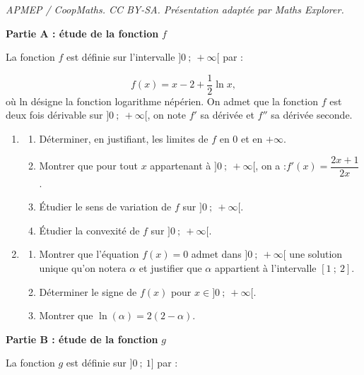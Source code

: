 \documentclass[10pt]{article}
\begin{document}
\noindent\textit{APMEP / CoopMaths. CC BY-SA. Présentation adaptée par Maths Explorer.}\par\medskip
\medskip

\textbf{Partie A : étude de la fonction }\boldmath$f$\unboldmath

\medskip

La fonction $f$ est définie sur l'intervalle $]0 ~;~+\infty[$ par : 

\[f(x)=x-2+\dfrac{1}{2} \ln x,\]
 où ln désigne la fonction logarithme népérien. On admet que la fonction $f$ est deux fois dérivable sur $] 0 ~;~ +\infty[$, on note $f'$ sa dérivée et $f''$ sa dérivée seconde.

\begin{enumerate}
	\item \begin{enumerate}
		\item Déterminer, en justifiant, les limites de $f$ en 0 et en $+\infty$.

		\item Montrer que pour tout $x$ appartenant à $] 0 ~;~+\infty[$, on a :\quad $f'(x)=\dfrac{2x + 1}{2x}$.

		\item Étudier le sens de variation de $f$ sur $] 0 ~;~+\infty[$.

		\item Étudier la convexité de $f$ sur $] 0~;~ +\infty[$.
	\end{enumerate}

	\item \begin{enumerate}
		\item Montrer que l'équation $f(x)=0$ admet dans $] 0 ~;~ +\infty[$ une solution unique qu'on notera $\alpha$ et justifier que $\alpha$ appartient à l'intervalle $[1~;~2]$.

		\item Déterminer le signe de $f(x)$ pour $x \in] 0 ~;~ +\infty[$.

		\item Montrer que $\ln (\alpha)=2(2-\alpha)$.
	\end{enumerate}
\end{enumerate}

\medskip

\textbf{Partie B : étude de la fonction }\boldmath $g$\unboldmath

\smallskip

La fonction $g$ est définie sur $] 0~;~1]$ par :
\end{document}
